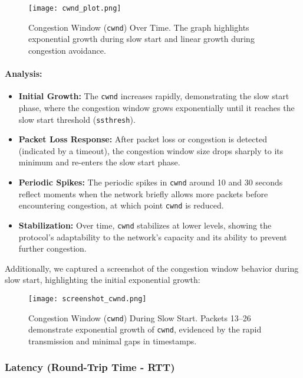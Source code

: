 \documentclass[11pt]{article}
\begin{document}
\begin{figure}[H]
    \centering
    \texttt{[image: cwnd\_plot.png]}
    \caption{Congestion Window (\texttt{cwnd}) Over Time. The graph highlights exponential growth during slow start and linear growth during congestion avoidance.}
    \label{fig:cwnd_plot}
\end{figure}

\paragraph{Analysis:}

\begin{itemize}
    \item \textbf{Initial Growth:} The \texttt{cwnd} increases rapidly, demonstrating the slow start phase, where the congestion window grows exponentially until it reaches the slow start threshold (\texttt{ssthresh}).
    \item \textbf{Packet Loss Response:} After packet loss or congestion is detected (indicated by a timeout), the congestion window size drops sharply to its minimum and re-enters the slow start phase.
    \item \textbf{Periodic Spikes:} The periodic spikes in \texttt{cwnd} around 10 and 30 seconds reflect moments when the network briefly allows more packets before encountering congestion, at which point \texttt{cwnd} is reduced.
    \item \textbf{Stabilization:} Over time, \texttt{cwnd} stabilizes at lower levels, showing the protocol's adaptability to the network's capacity and its ability to prevent further congestion.
\end{itemize}

Additionally, we captured a screenshot of the congestion window behavior during slow start, highlighting the initial exponential growth:

\begin{figure}[H]
    \centering
    \texttt{[image: screenshot\_cwnd.png]}
    \caption{Congestion Window (\texttt{cwnd}) During Slow Start. Packets 13–26 demonstrate exponential growth of \texttt{cwnd}, evidenced by the rapid transmission and minimal gaps in timestamps.}
    \label{fig:cwnd_slow_start}
\end{figure}

\subsubsection{Latency (Round-Trip Time - RTT)}
\end{document}
